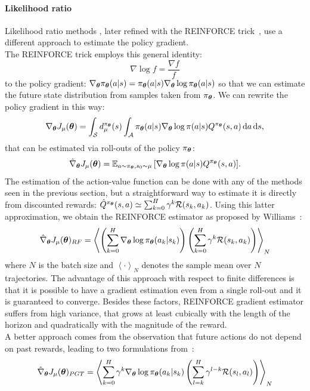 \paragraph{Likelihood ratio}
Likelihood ratio methods \cite{Glynn:1990:LRG:84537.84552}, later refined with the REINFORCE trick~\cite{Williams92simplestatistical}, use a different approach to estimate the policy gradient.\\
The REINFORCE trick employs this general identity:
\[
\nabla\log f = \frac{\nabla f}{f}
\]
to the policy gradient: $\nabla_{\vtheta} \pi_{\vtheta}(a | s) = \pi_{\vtheta}(a|s)\nabla_{\vtheta}\log \pi_{\vtheta}(a | s)$ so that we can estimate the future state distribution from samples taken from $\pi_{\vtheta}$.
We can rewrite the policy gradient in this way:
\[
\gradj = \int_{\sspace} d_\mu^{\pi_{\vtheta}}(s) \int_{\aspace}\pi_{\vtheta}(a|s)\nabla_{\vtheta} \log \pi(a|s) Q^{\pi_{\vtheta}}(s,a) \de a \de s,
\]
that can be estimated via roll-outs of the policy $\pi_{\vtheta}$:
\[
\hat{\nabla}_{\vtheta}J_\mu(\vtheta) = \EV[a \sim \pi_{\vtheta}, s_0 \sim \mu]{\nabla_{\vtheta} \log \pi(a|s) Q^{\pi_{\vtheta}}(s,a) }.
\]
The estimation of the action-value function can be done with any of the methods seen in the previous section, but a straightforward way to estimate it is directly from discounted rewards: $\hat{Q}^{\pi_{\vtheta}}(s,a) \simeq \sum_{k=0}^H \gamma^k\rfunc (s_k,a_k)$. Using this latter approximation, we obtain the REINFORCE estimator as proposed by Williams~\cite{Williams92simplestatistical}:
\begin{equation}
\label{eq:reinforce}
\hat{\nabla}_{\vtheta}J_\mu(\vtheta)_{RF} = \left\langle \left(\sum_{k=0}^{H} \nabla_{\vtheta}\log\pi_{\vtheta}(a_k|s_k)  \right)\left(\sum_{k=0}^H \gamma^k\rfunc(s_k,a_k)\right) \right\rangle_{N}
\end{equation}
where $N$ is the batch size and $\left\langle \cdot\right\rangle_N$ denotes the sample mean over $N$ trajectories. The advantage of this approach with respect to finite differences is that it is possible to have a gradient estimation even from a single roll-out and it is guaranteed to converge. Besides these factors, REINFORCE gradient estimator suffers from high variance, that grows at least cubically with the length of the horizon and quadratically with the magnitude of the reward.\\
A better approach comes from the observation that future actions do not depend on past rewards, leading to two formulations from~\cite{Sutton:1999:PGM:3009657.3009806}:
\[
\hat{\nabla}_{\vtheta}J_\mu(\vtheta)_{PGT} = \left\langle \sum_{k=0}^{H} \gamma^k \nabla_{\vtheta}\log\pi_{\vtheta}(a_k|s_k) \left(\sum_{l=k}^H \gamma^{l-k}\rfunc(s_l,a_l)\right) \right\rangle_{N}
\]
